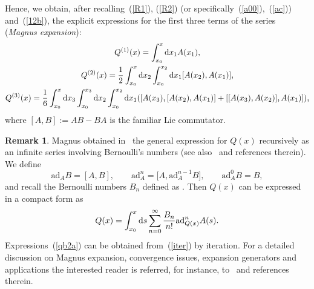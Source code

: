 \documentclass[10pt,a4paper]{amsart}
\numberwithin{equation}{section}
\theoremstyle{definition}
\newtheorem{rem}[thm]{Remark}
\def\mathcal#1{#1}%
\begin{document}
Hence, we obtain, after recalling~(\ref{R1}), (\ref{R2}) (or specifically~(\ref{a00}),~(\ref{ac})) and~(\ref{12b}), the explicit expressions for the first three terms of the series ({\it Magnus expansion}):
\begin{gather}
{\mathcal Q}^{(1)}(x) = \int_{x_0}^x {\rm d}x_1 A(x_1), \label{qb2a} \\
{\mathcal Q}^{(2)}(x) = \frac{1}{2} \int_{x_0}^x{\rm d}x_2 \int_{x_0}^{x_2} {\rm d}x_1 [A(x_2), A(x_1) ], \nonumber \\
 {\mathcal Q}^{(3)}(x) = \frac{1}{6} \int_{x_0}^x{\rm d}x_3 \int_{x_0}^{x_3} {\rm d}x_2 \int_{x_0}^{x_2} {\rm d}x_1 ( [ A(x_3), [ A(x_2), A(x_1) ] +
 [ [ A(x_3), A(x_2) ], A(x_1) ] ), \nonumber
\end{gather}
where $ [A, B ] := AB - BA$ is the familiar Lie commutator.
\begin{rem}
Magnus obtained in~\cite{Magnus} the general expression for ${\mathcal Q}(x)$ recursively as an infinite series involving Bernoulli's numbers (see also~\cite{review} and references therein). We define
\begin{equation*}
\mbox{ad}_AB = [ A, B ], \qquad \mbox{ad}^n_A = \bigl[A, \mbox{ad}^{n-1}_AB \bigr],
\qquad \mbox{ad}^0_AB = B,
\end{equation*}
and recall the Bernoulli numbers $B_n$ defined as .
Then ${\mathcal Q}(x)$ can be expressed in a compact form as
\begin{equation}
{\mathcal Q}(x) = \int_{x_0} ^x {\rm d}s \sum_{n=0}^{\infty} \frac{B_n}{n!}\mbox{ad}^n_{{\mathcal Q}(x)}A(s). \label{iter}
\end{equation}
Expressions~(\ref{qb2a}) can be obtained from~(\ref{iter}) by iteration. For a detailed discussion on Magnus expansion, convergence issues, expansion generators and applications the interested reader is referred, for instance, to~\cite{review, EbraMan, Fer} and references therein.
\end{rem}
\end{document}
